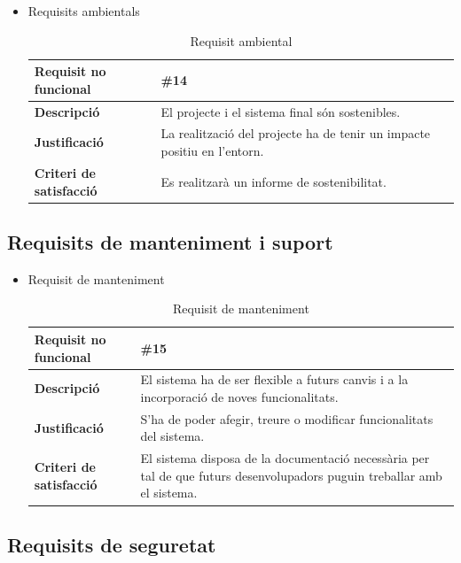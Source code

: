 \begin{itemize}
\item{Requisits ambientals}

\begin{table}[!h]
\centering
\begin{tabular}{|l|M|}
\hline
\textbf{Requisit no funcional }& \#14   \\ \hline
\textbf{Descripció} & El projecte i el sistema final són sostenibles. \\ \hline
\textbf{Justificació} & La realització del projecte ha de tenir un impacte positiu en l’entorn. \\ \hline
\textbf{Criteri de satisfacció} & Es realitzarà un informe de sostenibilitat.\\ \hline
\end{tabular}
\label{}
\caption{Requisit ambiental}
\end{table}

\end{itemize}

\clearpage

\subsection{Requisits de manteniment i suport}

\begin{itemize}
\item{Requisit de manteniment}

\begin{table}[!h]
\centering
\begin{tabular}{|l|M|}
\hline
\textbf{Requisit no funcional }& \#15  \\ \hline
\textbf{Descripció} & El sistema ha de ser flexible a futurs canvis i a la incorporació de noves funcionalitats.\\ \hline
\textbf{Justificació} & S’ha de poder afegir, treure o modificar funcionalitats
del sistema. \\ \hline
\textbf{Criteri de satisfacció} & El sistema disposa de la documentació necessària per tal de que futurs desenvolupadors puguin treballar amb el sistema.\\ \hline
\end{tabular}
\label{}
\caption{Requisit de manteniment}
\end{table}


\end{itemize}

\subsection{Requisits de seguretat}

